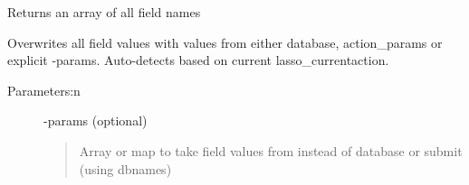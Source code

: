 \documentclass[letterpaper,10pt,english]{sphinxmanual}
\begin{document}
\begin{fulllineitems}

\begin{fulllineitems}
\label{knop_form:knop_form.keys}
Returns an array of all field names

\end{fulllineitems}


\begin{fulllineitems}
\label{knop_form:knop_form.keyvalue}
\end{fulllineitems}


\begin{fulllineitems}
\label{knop_form:knop_form.legend}
\end{fulllineitems}



\begin{fulllineitems}
\end{fulllineitems}


\begin{fulllineitems}
\label{knop_form:knop_form.loadfields}
\end{fulllineitems}


\begin{fulllineitems}
Overwrites all field values with values from either database, action\_params or explicit -params.
Auto-detects based on current lasso\_currentaction.
\begin{description}
\item[{Parameters:n}] \leavevmode
-params (optional)
\begin{quote}

Array or map to take field values from instead of database or submit
(using dbnames)
\end{quote}


\end{description}
\end{fulllineitems}
\end{fulllineitems}
\end{document}
